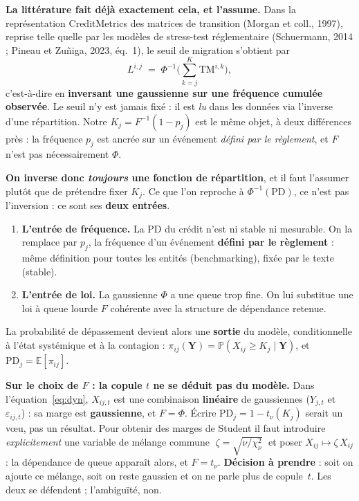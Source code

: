 \documentclass[11pt,a4paper]{article}
\newcommand{\Y}{Y}
\newcommand{\eps}{\varepsilon}
\begin{document}
\begin{cle}
\textbf{La littérature fait déjà exactement cela, et l'assume.} Dans la représentation
CreditMetrics des matrices de transition (Morgan et coll., 1997), reprise telle quelle par
les modèles de stress-test réglementaire (Schuermann, 2014 ; Pineau et Zu\~niga, 2023,
éq.~1), le seuil de migration s'obtient par
\[
L^{i,j} \;=\; \Phi^{-1}\!\Big(\textstyle\sum_{k=j}^{K} \mathrm{TM}^{i,k}\Big),
\]
c'est-à-dire en \textbf{inversant une gaussienne sur une fréquence cumulée observée}.
Le seuil n'y est jamais \og{}fixé\fg{} : il est \emph{lu} dans les données via l'inverse
d'une répartition. Notre $K_j = F^{-1}(1-p_j)$ est le même objet, à deux différences près :
la fréquence $p_j$ est ancrée sur un événement \emph{défini par le règlement}, et $F$ n'est
pas nécessairement $\Phi$.
\end{cle}

\noindent \textbf{On inverse donc \emph{toujours} une fonction de répartition}, et il faut
l'assumer plutôt que de prétendre \og{}fixer $K_j$\fg{}. Ce que l'on reproche à
$\Phi^{-1}(\mathrm{PD})$, ce n'est pas l'inversion : ce sont ses \textbf{deux entrées}.
\begin{enumerate}[leftmargin=1.4em,itemsep=2pt]
\item \textbf{L'entrée de fréquence.} La PD du crédit n'est ni stable ni mesurable. On la
  remplace par $p_j$, la fréquence d'un événement \textbf{défini par le règlement} :
  même définition pour toutes les entités (benchmarking), fixée par le texte (stable).
\item \textbf{L'entrée de loi.} La gaussienne $\Phi$ a une queue trop fine. On lui substitue
  une loi à queue lourde $F$ cohérente avec la structure de dépendance retenue.
\end{enumerate}
La probabilité de dépassement devient alors une \textbf{sortie} du modèle, conditionnelle à
l'état systémique et à la contagion : $\pi_{ij}(\mathbf Y) = \mathbb P(X_{ij} \ge K_j \mid
\mathbf Y)$, et $\mathrm{PD}_j = \mathbb E[\pi_{ij}]$.

\begin{attention}
\textbf{Sur le choix de $F$ : la copule $t$ ne se déduit pas du modèle.} Dans
l'équation~\eqref{eq:dyn}, $X_{ij,t}$ est une combinaison \textbf{linéaire} de gaussiennes
($\Y_{j,t}$ et $\eps_{ij,t}$) : sa marge est \textbf{gaussienne}, et $F = \Phi$. Écrire
$\mathrm{PD}_j = 1 - t_\nu(K_j)$ serait un v\oe u, pas un résultat. Pour obtenir des marges
de Student il faut introduire \emph{explicitement} une variable de mélange commune
$\;\zeta = \sqrt{\nu/\chi^2_\nu}\;$ et poser $X_{ij} \mapsto \zeta\,X_{ij}$ : la dépendance
de queue apparaît alors, et $F = t_\nu$. \textbf{Décision à prendre} : soit on ajoute ce
mélange, soit on reste gaussien et on ne parle plus de copule~$t$. Les deux se défendent ;
l'ambiguïté, non.
\end{attention}
\end{document}
